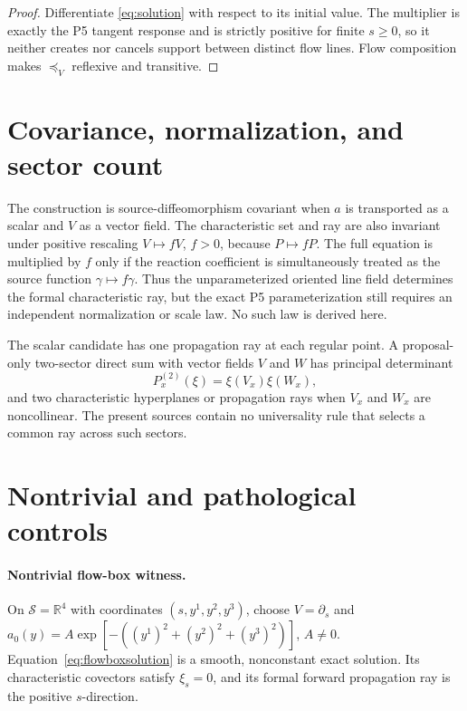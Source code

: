\documentclass[11pt]{article}
\newcommand{\Sub}{\mathcal S}
\begin{document}
\begin{proof}
Differentiate \eqref{eq:solution} with respect to its initial value.  The
multiplier is exactly the P5 tangent response and is strictly positive for
finite \(s\geq0\), so it neither creates nor cancels support between distinct
flow lines.  Flow composition makes \(\preceq_V\) reflexive and transitive.
\end{proof}

\section{Covariance, normalization, and sector count}

The construction is source-diffeomorphism covariant when \(a\) is transported
as a scalar and \(V\) as a vector field.  The characteristic set and ray are
also invariant under positive rescaling \(V\mapsto fV\), \(f>0\), because
\(P\mapsto fP\).  The full equation is multiplied by \(f\) only if the
reaction coefficient is simultaneously treated as the source function
\(\gamma\mapsto f\gamma\).  Thus the unparameterized oriented line field
determines the formal characteristic ray, but the exact P5 parameterization
still requires an independent normalization or scale law.  No such law is
derived here.

The scalar candidate has one propagation ray at each regular point.  A
proposal-only two-sector direct sum with vector fields \(V\) and \(W\) has
principal determinant
\[
 P^{(2)}_x(\xi)=\xi(V_x)\xi(W_x),
\tag{11}\label{eq:twosector}
\]
and two characteristic hyperplanes or propagation rays when \(V_x\) and
\(W_x\) are noncollinear.  The present sources contain no universality rule
that selects a common ray across such sectors.

\section{Nontrivial and pathological controls}

\paragraph{Nontrivial flow-box witness.}
On \(\Sub=\mathbb R^4\) with coordinates \((s,y^1,y^2,y^3)\), choose
\(V=\partial_s\) and
\(a_0(y)=A\exp[-((y^1)^2+(y^2)^2+(y^3)^2)]\), \(A\neq0\).
Equation~\eqref{eq:flowboxsolution} is a smooth, nonconstant exact solution.
Its characteristic covectors satisfy \(\xi_s=0\), and its formal forward
propagation ray is the positive \(s\)-direction.
\end{document}
